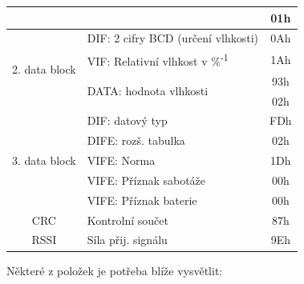 \begin{table}[!ht]
{\begin{tabular}{|c|l|c|}
  &  & 01h  \\ \hline
 \multirow{4}{*}{2. data block} & DIF: 2 cifry BCD (určení vlhkosti) & 0Ah  \\ \cline{2-3} 
  & VIF: Relativní vlhkost v \%\textsuperscript{-1} & 1Ah  \\ \cline{2-3} 
  & \multirow{2}{*}{DATA: hodnota vlhkosti} & 93h  \\ \cline{3-3} 
  &  & 02h   \\ \hline
 \multirow{5}{*}{3. data block} & DIF: datový typ & FDh \\ \cline{2-3} 
  & DIFE: rozš. tabulka & 02h \\ \cline{2-3} 
  & VIFE: Norma & 1Dh \\ \cline{2-3} 
  & VIFE: Příznak sabotáže & 00h  \\ \cline{2-3} 
  & VIFE: Příznak baterie & 00h \\ \hline
 CRC & Kontrolní součet & 87h  \\ \hline
 RSSI & Síla přij. signálu& 9Eh  \\ \hline \hline
\end{tabular}}
\end{table}

\newpage{}

Některé z položek je potřeba blíže vysvětlit:


